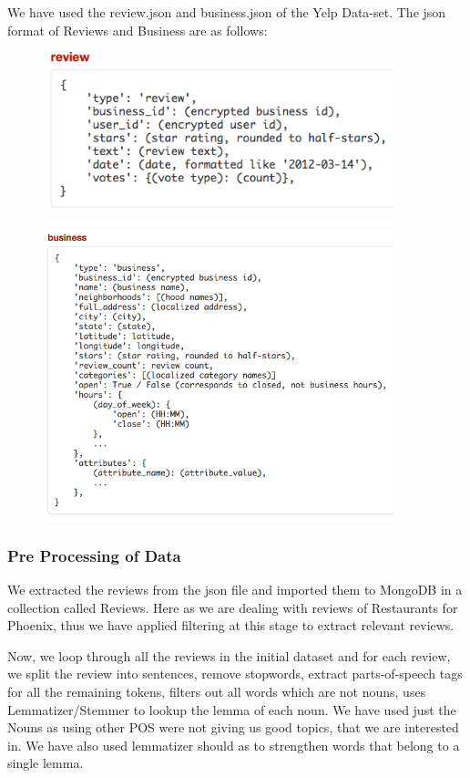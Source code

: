 \documentclass[12pt]{article} %
\begin{document}
We have used the review.json and business.json of the Yelp Data-set. The json format of Reviews and Business are as follows:

\begin{figure}[h]
\begin{center}
\includegraphics[width=4in]{review.png}
\end{center}
\end{figure}

\begin{figure}[h]
\begin{center}
\includegraphics[width=4in]{business.png}
\end{center}
\end{figure}

\subsubsection{Pre Processing of Data}

We extracted the reviews from the json file and imported them to MongoDB in a collection called Reviews. Here as we are dealing with reviews of Restaurants for Phoenix, thus we have applied filtering at this stage to extract relevant reviews.

Now, we loop through all the reviews in the initial dataset and for each review, we split the review into sentences, remove stopwords, extract parts-of-speech tags for all the remaining tokens, filters out all words which are not nouns, uses Lemmatizer/Stemmer to lookup the lemma of each noun. We have used just the Nouns as using other POS were not giving us good topics, that we are interested in. We have also used lemmatizer should as to strengthen words that belong to a single lemma.
\end{document}
